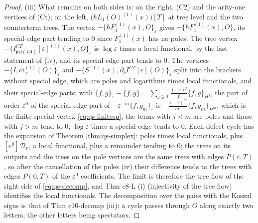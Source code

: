 \documentclass[11pt]{article}
\numberwithin{equation}{section}
\theoremstyle{plain}
\theoremstyle{definition}
\begin{document}
\begin{proof}
(iii) What remains on both sides is: on the right, (C2) and the arity-one vertices of (Ct); on the left, $\big(\hbar L_1(O)^{(1)}(x)\big)[T]$ at tree level and the two counterterm trees. The vertex $-\{\hbar F_1^{(1)}(x),O\}_\varepsilon$ gives $-\{\hbar F_1^{(1)}(x),O\}$, its special-edge part tending to $0$ since $F_1^{(1)}(x)$ has no poles. The tree vertex $-\{I^{CT}_{\mathfrak{psl}(4|4)}[\varepsilon]^{(1)}(x),O\}_\varepsilon$ is $\log\varepsilon$ times a local functional, by the last statement of (iv), and its special-edge part tends to $0$. The vertices $-\{I,\mathrm{ct}^{(1)}_x(O)\}_\varepsilon$ and $-\{S^{(1)}(x),\partial_\delta I^{CT}[\varepsilon](O)\}_\varepsilon$ split into the brackets without special edge, which are poles and logarithms times local functionals, and their special-edge parts: with $\{f,g\}_\varepsilon-\{f,g\}=\sum_{j\ge1}\frac{(-\varepsilon)^j}{j!}\{f,g\}_{H^j}$, the part of order $\varepsilon^0$ of the special-edge part of $-\varepsilon^{-m}\{f,g_m\}_\varepsilon$ is $-\frac{(-1)^m}{m!}\{f,g_m\}_{H^m}$, which is the finite special vertex \eqref{eq:qs-finitesp}; the terms with $j<m$ are poles and those with $j>m$ tend to $0$; $\log\varepsilon$ times a special edge tends to $0$. Each defect cycle has the expansion of Theorem \ref{thm:qs-simplex}: poles times local functionals, plus $[\varepsilon^0]\mathcal D_x$, a local functional, plus a remainder tending to $0$; the trees on its outputs and the trees on the pole vertices are the same trees with edges $P(\varepsilon,T)$, so after the cancellation of the poles (iv) their difference tends to the trees with edges $P(0,T)$ of the $\varepsilon^0$ coefficients. The limit is therefore the tree flow of the right side of \eqref{eq:qs-decomp}, and Thm c8-L (i) (injectivity of the tree flow) identifies the local functionals. The decomposition over the pairs with the Koszul signs is that of Thm c10-decomp (iii): a cycle passes through $O$ along exactly two letters, the other letters being spectators.


\end{proof}
\end{document}
